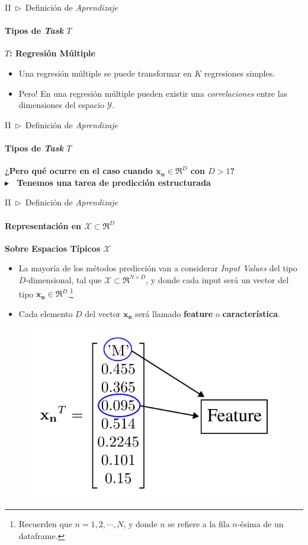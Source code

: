 \documentclass[xcolor=dvipsnames]{beamer}
\begin{document}
    \begin{frame}{II~$\rhd$~Definición de \textit{Aprendizaje}}
    \framesubtitle{Tipos de \textit{Task} \( T \)}
        \textbf{\Large{\( T \): Regresión Múltiple}}
        \vspace{3mm}
        \begin{itemize}
            \item Una regresión múltiple se puede transformar en $K$ regresiones simples.
            \item Pero! En una regresión múltiple pueden existir una \textit{correlaciones} entre las dimensiones del espacio $\mathcal{Y}$.
        \end{itemize}
    \end{frame}

    \begin{frame}{II~$\rhd$~Definición de \textit{Aprendizaje}}
    \framesubtitle{Tipos de \textit{Task} \( T \)}
        \centering
        \textbf{\Large{¿Pero qué ocurre en el caso cuando $\mathbf{x_{n}}\in\Re^{D}$ con $D>1$?}}\\
        \vspace{15mm}
        \textbf{\Large{$\blacktriangleright$~ Tenemos una tarea de predicción estructurada}}
    \end{frame}

    \begin{frame}{II~$\rhd$~Definición de \textit{Aprendizaje}}
    \framesubtitle{Representación en $\mathcal{X}\subset\Re^{D}$}
        \textbf{\Large{Sobre Espacios Típicos $\mathcal{X}$}}
        \vspace{4mm}
        \begin{itemize}
            \item La mayoría de los métodos predicción van a considerar \textit{Input Values} del tipo $D$-dimensional, tal que $\mathcal{X}\subset\Re^{N\times D}$, y donde cada input será un vector del tipo $\mathbf{x_{n}}\in\Re^{D}$.\footnote{Recuerden que $n=1,2,\cdots,N$, y donde $n$ se refiere a la fila $n$-ésima de un dataframe.}
            \item Cada elemento $D$ del vector $\mathbf{x_{n}}$ será llamado \textbf{feature} o \textbf{característica}.
        \end{itemize}
        \begin{figure}
            \centering
            \includegraphics[width=0.45\linewidth]{imgs/def01/taskSpace01.png}
        \end{figure}
    \end{frame}
\end{document}
